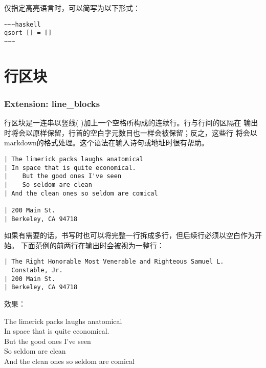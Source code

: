 \documentclass[cn]{elegantbook}
\begin{document}
仅指定高亮语言时，可以简写为以下形式：

\begin{lstlisting}
~~~haskell
qsort [] = []
~~~
\end{lstlisting}

\hypertarget{ux884cux533aux5757}{%
\section{行区块}\label{ux884cux533aux5757}}

\hypertarget{extension-line_blocks}{%
\subsubsection{Extension: line\_blocks}\label{extension-line_blocks}}

行区块是一连串以竖线(
\textbar)加上一个空格所构成的连续行。行与行间的区隔在
输出时将会以原样保留，行首的空白字元数目也一样会被保留；反之，这些行
将会以markdown的格式处理。这个语法在输入诗句或地址时很有帮助。

\begin{lstlisting}
| The limerick packs laughs anatomical
| In space that is quite economical.
|    But the good ones I've seen
|    So seldom are clean
| And the clean ones so seldom are comical

| 200 Main St.
| Berkeley, CA 94718
\end{lstlisting}

如果有需要的话，书写时也可以将完整一行拆成多行，但后续行必须以空白作为开始。
下面范例的前两行在输出时会被视为一整行：

\begin{lstlisting}
| The Right Honorable Most Venerable and Righteous Samuel L.
  Constable, Jr.
| 200 Main St.
| Berkeley, CA 94718
\end{lstlisting}

效果：

The limerick packs laughs anatomical\\
In space that is quite economical.\\
\hspace*{0.333em}\hspace*{0.333em}\hspace*{0.333em}But the good ones
I've seen\\
\hspace*{0.333em}\hspace*{0.333em}\hspace*{0.333em}So seldom are clean\\
And the clean ones so seldom are comical
\end{document}
